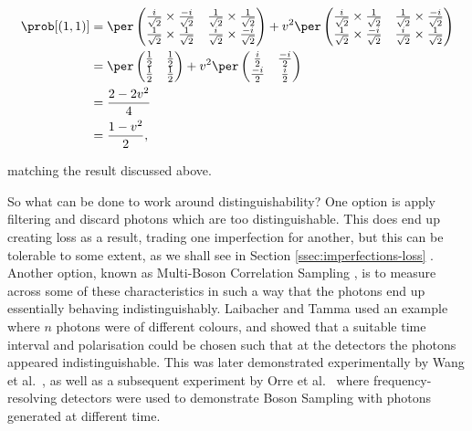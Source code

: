 \begin{align}
\prob[(1,1)] &= \per\begin{pmatrix}\frac{i}{\sqrt{2}}\times\frac{-i}{\sqrt{2}}&\frac{1}{\sqrt{2}}\times\frac{1}{\sqrt{2}}\\\frac{1}{\sqrt{2}}\times\frac{1}{\sqrt{2}}&\frac{i}{\sqrt{2}}\times\frac{-i}{\sqrt{2}}\end{pmatrix} + v^2 \per\begin{pmatrix}\frac{i}{\sqrt{2}}\times\frac{1}{\sqrt{2}}&\frac{1}{\sqrt{2}}\times\frac{-i}{\sqrt{2}}\\\frac{1}{\sqrt{2}}\times\frac{-i}{\sqrt{2}}&\frac{i}{\sqrt{2}}\times\frac{1}{\sqrt{2}}\end{pmatrix}\\
&= \per\begin{pmatrix}\frac{1}{2}&\frac{1}{2}\\\frac{1}{2}&\frac{1}{2}\end{pmatrix} + v^2 \per\begin{pmatrix}\frac{i}{2}&\frac{-i}{2}\\\frac{-i}{2}&\frac{i}{2}\end{pmatrix}\\
&= \frac{2-2v^2}{4}\\
&= \frac{1-v^2}{2},
\end{align}

\noindent matching the result discussed above.

So what can be done to work around distinguishability? One option is apply filtering and discard photons which are too distinguishable. This does end up creating loss as a result, trading one imperfection for another, but this can be tolerable to some extent, as we shall see in Section \ref{ssec:imperfections-loss} \cite{rohde2012, aaronson2016}. Another option, known as Multi-Boson Correlation Sampling \cite{tamma2014, tamma2015, laibacher2015, tamma2016, laibacher2017}, is to measure across some of these characteristics in such a way that the photons end up essentially behaving indistinguishably. Laibacher and Tamma used an example where $n$ photons were of different colours, and showed that a suitable time interval and polarisation could be chosen such that at the detectors the photons appeared indistinguishable. This was later demonstrated experimentally by Wang et al.~\cite{wang2018timebin}, as well as a subsequent experiment by Orre et al.~\cite{orre2019} where frequency-resolving detectors were used to demonstrate Boson Sampling with photons generated at different time.

